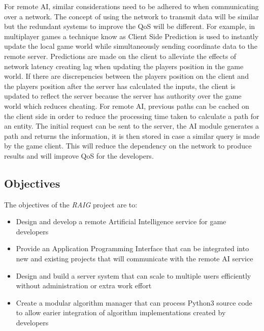 \documentclass[12pt,a4paper,titlepage]{article}
\begin{document}
For remote AI, similar considerations need to be adhered to when communicating over a network. The concept of using the network to transmit data will be similar but the redundant systems to improve the QoS will be different. For example, in multiplayer games a technique know as Client Side Prediction is used to instantly update the local game world while simultaneously sending coordinate data to the remote server. Predictions are made on the client to alleviate the effects of network latency creating lag when updating the players position in the game world. If there are discrepencies between the players position on the client and the players position after the server has calculated the inputs, the client is updated to reflect the server because the server has authority over the game world which reduces cheating. For remote AI, previous paths can be cached on the client side in order to reduce the processing time taken to calculate a path for an entity. The initial request can be sent to the server, the AI module generates a path and returns the information, it is then stored in case a similar query is made by the game client. This will reduce the dependency on the network to produce results and will improve QoS for the developers. 

\subsection{Objectives}


The objectives of the \textit{RAIG} project are to:

\begin{itemize}
\item{Design and develop a remote Artificial Intelligence service for game developers}
\item{Provide an Application Programming Interface that can be integrated into new and existing projects that will communicate with the remote AI service}
\item{Design and build a server system that can scale to multiple users efficiently without administration or extra work effort}
\item{Create a modular algorithm manager that can process Python3 source code to allow earier integration of algorithm implementations created by developers}
\end{itemize}
\end{document}
